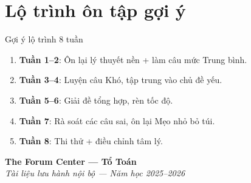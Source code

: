 
\backmatter



\chapter*{Lộ trình ôn tập gợi ý}

\begin{meobotui}{Gợi ý lộ trình 8 tuần}
\begin{enumerate}[leftmargin=2em, itemsep=6pt]
  \item \textbf{Tuần 1--2}: Ôn lại lý thuyết nền + làm câu mức Trung bình.
  \item \textbf{Tuần 3--4}: Luyện câu Khó, tập trung vào chủ đề yếu.
  \item \textbf{Tuần 5--6}: Giải đề tổng hợp, rèn tốc độ.
  \item \textbf{Tuần 7}: Rà soát các câu sai, ôn lại Mẹo nhỏ bỏ túi.
  \item \textbf{Tuần 8}: Thi thử + điều chỉnh tâm lý.
\end{enumerate}
\end{meobotui}

\vfill

\begin{center}
  \separator
  {\large\sffamily\bfseries\color{ForumDarkBlue} The Forum Center — Tổ Toán}\\[6pt]
  {\color{ForumGray}\textit{Tài liệu lưu hành nội bộ — Năm học 2025--2026}}
\end{center}
